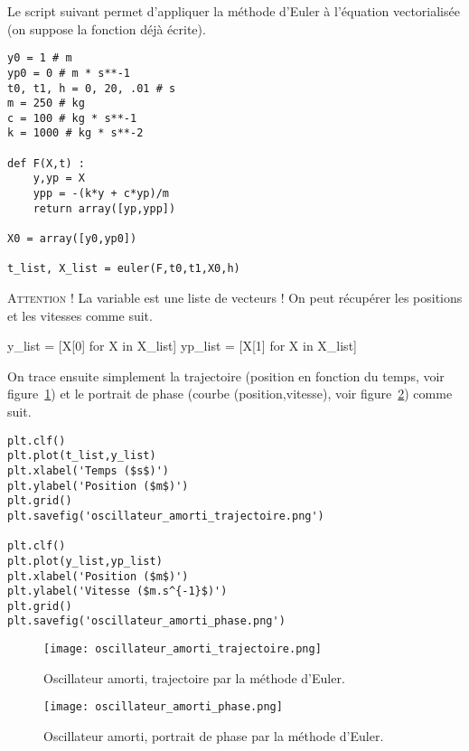 Le script suivant permet d'appliquer la méthode d'Euler à l'équation vectorialisée (on suppose la fonction  déjà écrite). 
\begin{lstlisting}
y0 = 1 # m
yp0 = 0 # m * s**-1
t0, t1, h = 0, 20, .01 # s
m = 250 # kg
c = 100 # kg * s**-1
k = 1000 # kg * s**-2

def F(X,t) :
    y,yp = X
    ypp = -(k*y + c*yp)/m
    return array([yp,ypp])

X0 = array([y0,yp0])

t_list, X_list = euler(F,t0,t1,X0,h)
\end{lstlisting}

\textsc{Attention !} La variable  est une liste de vecteurs ! On peut récupérer les positions et les vitesses comme suit. 

\begin{pyverbatim}
y_list = [X[0] for X in X_list]
yp_list = [X[1] for X in X_list]
\end{pyverbatim}

On trace ensuite simplement la trajectoire (position en fonction du temps, voir figure~\ref{11:fig:oscillateur_amorti_trajectoire}) et le portrait de phase (courbe (position,vitesse), voir figure~\ref{11:fig:oscillateur_amorti_phase}) comme suit. 
\begin{lstlisting}
plt.clf()
plt.plot(t_list,y_list)
plt.xlabel('Temps ($s$)')
plt.ylabel('Position ($m$)')
plt.grid()
plt.savefig('oscillateur_amorti_trajectoire.png')

plt.clf()
plt.plot(y_list,yp_list)
plt.xlabel('Position ($m$)')
plt.ylabel('Vitesse ($m.s^{-1}$)')
plt.grid()
plt.savefig('oscillateur_amorti_phase.png')
\end{lstlisting}
\begin{figure}[!h]
    \begin{center}
        \texttt{[image: oscillateur\_amorti\_trajectoire.png]}
        \caption{Oscillateur amorti, trajectoire par la méthode d'Euler.}
        \label{11:fig:oscillateur_amorti_trajectoire}
    \end{center}
\end{figure}
\begin{figure}[!h]
    \begin{center}
        \texttt{[image: oscillateur\_amorti\_phase.png]}
        \caption{Oscillateur amorti, portrait de phase par la méthode d'Euler.}
        \label{11:fig:oscillateur_amorti_phase}
    \end{center}
\end{figure}

